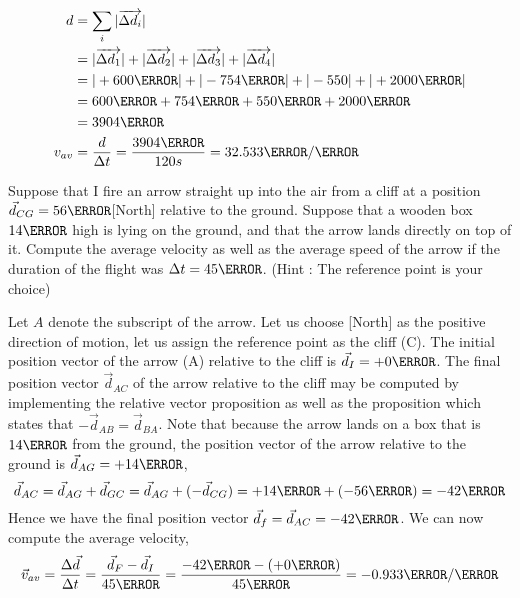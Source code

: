 \documentclass[12pt]{article} %
\begin{document}
\begin{qstn}[9]
\begin{soln}
\begin{align*}
	d &= \sum_i |\overrightarrow{\Delta d_i}|\\
	&= |\overrightarrow{\Delta d_1}| + |\overrightarrow{\Delta d_2}| +|\overrightarrow{\Delta d_3}| + |\overrightarrow{\Delta d_4}|\\
	&= |+600\m| + |-754\m| + |-550| + |+2000\m|\\
	&= 600\m  + 754\m + 550\m + 2000\m\\
	&= 3904\m \\
	v_{av} &= \frac{d}{\Delta t} = \frac{3904\m}{120s} = 32.533 \m / \s
\end{align*}
\end{soln}




\end{qstn}

\begin{qstn}[10]
Suppose that I fire an arrow straight up into the air from a cliff at a position $\vec d_{CG} = 56\m$[North] relative to the ground. Suppose that a wooden box $14\m$ high is lying on the ground, and that the arrow lands directly on top of it. Compute the average velocity as well as the average speed of the arrow if the duration of the flight was $\Delta t = 45\s$. (Hint : The reference point is your choice)


\begin{soln}
	Let $A$ denote the subscript of the arrow. Let us choose [North] as the positive direction of motion, let us assign the reference point as the cliff (C). The initial position vector of the arrow (A) relative to the cliff is $\vec d_I = +0\m$. The final position vector $\vec d_{AC}$ of the arrow relative to the cliff may be computed by implementing the relative vector proposition as well as the proposition which states that $-\vec d_{AB} = \vec d_{BA}$. Note that because the arrow lands on a box that is $14\m$ from the ground, the position vector of the arrow relative to the ground is $\vec d_{AG} = +14\m$,
	$$\vec d_{AC} = \vec d_{AG} + \vec d_{GC} =  \vec d_{AG} + (-\vec d_{CG}) = +14\m + (-56\m) = -42\m$$ 
	Hence we have the final position vector $\vec d_f = \vec d_{AC} = -42\m$. We can now compute the average velocity,
	$$\vec v_{av} = \frac{\Delta \vec d}{\Delta t} = \frac{\vec d_F - \vec d_I}{45 \s} = \frac{-42\m - (+0\m)}{45\s} = -0.933 \m / \s$$
\end{soln}



\end{qstn}
\end{document}
